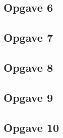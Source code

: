 \documentclass[een]{practicumverslag}
\begin{document}
\lipsum[7-7]

\subsection*{Opgave 6}

\lipsum[7-7]

\subsection*{Opgave 7}

\lipsum[7-7]

\subsection*{Opgave 8}

\lipsum[7-7]

\subsection*{Opgave 9}

\lipsum[7-7]

\subsection*{Opgave 10}

\lipsum[7-7]

\clearpage
\end{document}
